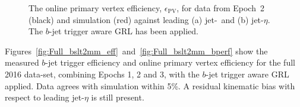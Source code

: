 \begin{figure}[!htb]
  \begin{center}
    \captionsetup[subfigure]{aboveskip=0pt,justification=centering}
  \end{center}
\vspace{-1em}
  \caption[
    The online primary vertex efficiency for data in Epoch~2 and for simulated events.
    The $b$-jet trigger aware GRL has been applied.
  ]
        {The online primary vertex efficiency, $\epsilon_{\text{PV}}$, for data from Epoch~2 (black) and simulation (red) against leading (a) jet-\pT~and (b) jet-$\eta$.
    The $b$-jet trigger aware GRL has been applied.}
  \label{fig:Epoch2_bslt2mm_bperf}
\end{figure}

Figures~\ref{fig:Full_bslt2mm_eff}~and~\ref{fig:Full_bslt2mm_bperf} show the measured
$b$-jet trigger efficiency and online primary vertex efficiency
for the full 2016 data-set, combining Epochs 1, 2 and 3,
with the $b$-jet trigger aware GRL applied.
Data agrees with simulation within 5\%.  A residual kinematic bias with respect to leading jet-$\eta$ is still present.

